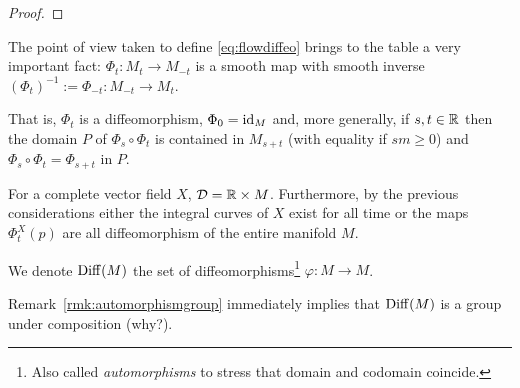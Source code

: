 \begin{proof}

\end{proof}

\begin{remark}\label{rmk:automorphismgroup}
  The point of view taken to define \eqref{eq:flowdiffeo} brings to the table a very important fact: $\Phi_t : M_t \to M_{-t}$ is a smooth map with smooth inverse $(\Phi_t)^{-1}:=\Phi_{-t}: M_{-t} \to M_t$.

  That is, $\Phi_t$ is a diffeomorphism, $\Phi_0 = \operatorname{id}_M$ and, more generally, if $s,t \in \mathbb{R}$ then the domain $P$ of $\Phi_s \circ \Phi_t$ is contained in $M_{s+t}$ (with equality if $sm \geq 0$) and $\Phi_s \circ \Phi_t = \Phi_{s+t}$ in $P$.  
\end{remark}

For a complete vector field $X$, $\mathcal{D} = \mathbb{R}\times M$. Furthermore, by the previous considerations either the integral curves of $X$ exist for all time or the maps $\Phi^X_t(p)$ are all diffeomorphism of the entire manifold $M$.

\begin{definition}
  We denote $\operatorname{Diff}(M)$ the set of diffeomorphisms\footnote{Also called \emph{automorphisms} to stress that domain and codomain coincide.} $\varphi: M \to M$.
\end{definition}

Remark~\ref{rmk:automorphismgroup} immediately implies that $\operatorname{Diff}(M)$ is a group under composition (why?).

